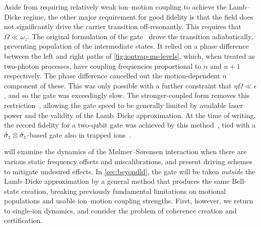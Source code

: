 Aside from requiring relatively weak ion--motion coupling to achieve the Lamb--Dicke regime, the other major requirement for good fidelity is that the field does not significantly drive the carrier transition off-resonantly.
This requires that $\Omega\ll\omega_z$.
The original formulation of the gate~\cite{Sorensen1999} drove the transition adiabatically, preventing population of the intermediate states.
It relied on a phase difference between the left and right paths of \cref{fig:iontrap-ms-levels}, which, when treated as two-photon processes, have coupling frequencies proportional to $n$ and $n+1$ respectively.
The phase difference cancelled out the motion-dependent $n$ component of these.
This was only possible with a further constraint that $\eta\Omega\ll\epsilon$, and so the gate was exceedingly slow.
The stronger-coupled form removes this restriction~\cite{Sorensen2000}, allowing the gate speed to be generally limited by available laser power and the validity of the Lamb--Dicke approximation.
At the time of writing, the record fidelity for a two-qubit gate was achieved by this method~\cite{Gaebler2016}, tied with a $\hat{\sigma}_{\mkern-1mu z}\otimes\hat{\sigma}_{\mkern-1mu z}$-based gate also in trapped ions~\cite{Ballance2016}.

 will examine the dynamics of the M\o lmer--S\o rensen interaction when there are various static frequency offsets and miscalibrations, and present driving schemes to mitigate undesired effects.
In \cref{sec:beyondld}, the gate will be taken \emph{outside} the Lamb--Dicke approximation by a general method that produces the same Bell-state creation, breaking previously fundamental limitations on motional populations and usable ion--motion coupling strengths.
First, however, we return to single-ion dynamics, and consider the problem of coherence creation and certification.
